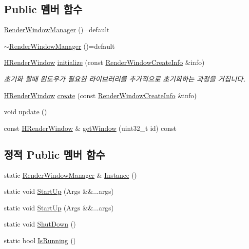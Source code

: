 \subsection*{Public 멤버 함수}
\begin{DoxyCompactItemize}
\item 
\hyperlink{classcpf_1_1_render_window_manager_ad4053984a55f9f773c35482731b3e384}{Render\+Window\+Manager} ()=default
\item 
\hyperlink{classcpf_1_1_render_window_manager_a6d119e5105d1e11a875d16715e05a1f9}{$\sim$\+Render\+Window\+Manager} ()=default
\item 
\hyperlink{namespacecpf_af5ffcc39bb6465427fc3b91366c917f6}{H\+Render\+Window} \hyperlink{classcpf_1_1_render_window_manager_a9e198c25b9f2eb5dd5b248e47532677d}{initialize} (const \hyperlink{structcpf_1_1_render_window_create_info}{Render\+Window\+Create\+Info} \&info)
\begin{DoxyCompactList}\small\item\em 초기화 할때 윈도우가 필요한 라이브러리를 추가적으로 초기화하는 과정을 거칩니다. \end{DoxyCompactList}\item 
\hyperlink{namespacecpf_af5ffcc39bb6465427fc3b91366c917f6}{H\+Render\+Window} \hyperlink{classcpf_1_1_render_window_manager_a9fa02758ec62cd361e8abd2c03b7cc17}{create} (const \hyperlink{structcpf_1_1_render_window_create_info}{Render\+Window\+Create\+Info} \&info)
\item 
void \hyperlink{classcpf_1_1_render_window_manager_adc7ef3bd3f5c4ad9b86899adeb69b0ee}{update} ()
\item 
const \hyperlink{namespacecpf_af5ffcc39bb6465427fc3b91366c917f6}{H\+Render\+Window} \& \hyperlink{classcpf_1_1_render_window_manager_a84798567443280ffacaaaf6f701483b9}{get\+Window} (uint32\+\_\+t id) const
\end{DoxyCompactItemize}
\subsection*{정적 Public 멤버 함수}
\begin{DoxyCompactItemize}
\item 
static \hyperlink{classcpf_1_1_render_window_manager}{Render\+Window\+Manager} \& \hyperlink{classcpf_1_1_t_module_ac8065254584cb0a6656c42f96859d190}{Instance} ()
\item 
static void \hyperlink{classcpf_1_1_t_module_a02fbf3c4d28a3328e81b0e8d0bdd93b0}{Start\+Up} (Args \&\&...args)
\item 
static void \hyperlink{classcpf_1_1_t_module_ac553266ad6255da045ef3f34b0f9bc16}{Start\+Up} (Args \&\&...args)
\item 
static void \hyperlink{classcpf_1_1_t_module_a61452801c61e2546b75a7a6a545e82ee}{Shut\+Down} ()
\item 
static bool \hyperlink{classcpf_1_1_t_module_acd38943803d522ba6dcf7f0871b2f502}{Is\+Running} ()
\end{DoxyCompactItemize}
